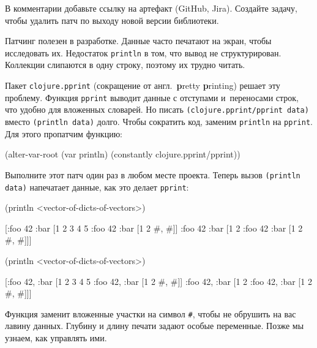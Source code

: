 \fi

В комментарии добавьте ссылку на артефакт (GitHub, Jira). Создайте задачу,
чтобы удалить патч по выходу новой версии библиотеки.

Патчинг полезен в разработке. Данные часто печатают на экран, чтобы исследовать
их. Недостаток \verb|println| в том, что вывод не структурирован. Коллекции
слипаются в одну строку, поэтому их трудно читать.


Пакет \verb|clojure.pprint| (сокращение от англ.~\textbf{p}retty \textbf{p}rinting)
решает эту проблему. Функция \verb|pprint| выводит данные с отступами и~переносами строк,
что удобно для вложенных словарей. Но писать \verb|(clojure.pprint/pprint data)|
вместо \verb|(println data)| долго. Чтобы сократить код, заменим \verb|println|
на \verb|pprint|. Для этого пропатчим функцию:

\begin{english}
  \begin{clojure}
(alter-var-root
 (var println)
 (constantly clojure.pprint/pprint))
  \end{clojure}
\end{english}

Выполните этот патч один раз в любом месте проекта. Теперь вызов
\verb|(println data)| напечатает данные, как это делает \verb|pprint|:

\ifx\DEVICETYPE\MOBILE

\begin{english}
  \begin{clojure}
(println <vector-of-dicts-of-vectors>)

[{:foo 42
  :bar [1 2 3 4 5 {:foo 42
                   :bar [1 2 {#, #}]}]}
 {:foo 42
  :bar [1 2 {:foo 42
             :bar [1 2 {#, #}]}]}]
  \end{clojure}
\end{english}

\else

\begin{english}
  \begin{clojure}
(println <vector-of-dicts-of-vectors>)

[{:foo 42, :bar [1 2 3 4 5 {:foo 42, :bar [1 2 {#, #}]}]}
 {:foo 42, :bar [1 2 {:foo 42, :bar [1 2 {#, #}]}]}]
  \end{clojure}
\end{english}

\fi

Функция заменит вложенные участки на символ \verb|#|, чтобы не обрушить на
вас лавину данных. Глубину и длину печати задают особые переменные. Позже мы
узнаем, как управлять ими.

